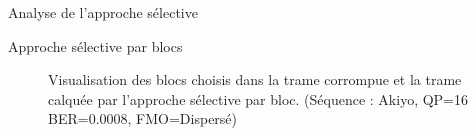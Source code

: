 \begin{section}{Analyse de l'approche sélective}
\begin{subsection}{Approche sélective par blocs}
\begin{figure}
{{			
		}
	} 
	\caption[Blocs choisis dans la trame corrompue et la trame calquée par
l'approche sélective par bloc (dispersé)]{Visualisation des blocs choisis dans
la trame corrompue et la trame calquée par l'approche sélective par bloc.
(Séquence : Akiyo, QP=16 BER=0.0008, FMO=Dispersé)}
	\label{fig-AkiyoBlockSel}
\end{figure}


\end{subsection}
\end{section}
